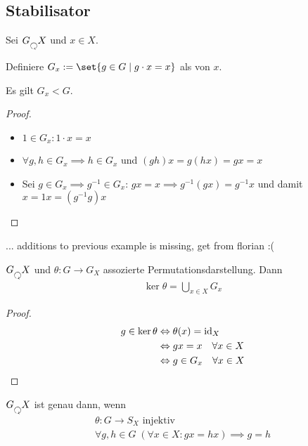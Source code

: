 \subsection*{Stabilisator}
Sei $G \Circlearrowleft X$ und $x \in X$.
\begin{definition}
	Definiere $G_x := \set{g \in G \mid g \cdot x = x}$ als  von $x$.
\end{definition}
\begin{lemma}
	Es gilt $G_x < G$.
\end{lemma}
\begin{proof}
	\begin{itemize}
		\item $1 \in G_x\colon 1 \cdot x = x$
		\item $\forall g,h \in G_x \implies h \in G_x$ und $(gh)x = g(hx) = gx = x$
		\item Sei $g \in G_x \implies g^{-1} \in G_x$: $gx = x \implies g^{-1}(gx) = g^{-1}x$ und damit $x = 1 x = (g^{-1}g)x$
	\end{itemize}
\end{proof}
... additions to previous example is missing, get from florian :(
\begin{lemma}
	$G \Circlearrowleft X$ und $\theta\colon G \to G_X$ assozierte Permutationsdarstellung. Dann
	\begin{align*}
	\ker \theta = \bigcup_{x \in X}G_x
	\end{align*}
\end{lemma}
\begin{proof}
	\begin{align*}
		g \in \ker \theta &\Leftrightarrow \theta(x) = \operatorname{id}_X\\
		&\Leftrightarrow g x = x \quad \forall x \in X\\
		&\Leftrightarrow g \in G_x \quad \forall x \in X
	\end{align*}
\end{proof}
\begin{definition}
	$G \Circlearrowleft X$ ist  genau dann, wenn
	\begin{align*}
	\theta\colon G \to S_X \text{ injektiv}\\
	\forall g,h \in G \; (\forall x \in X \colon gx = hx) \implies g = h
	\end{align*}
\end{definition}
